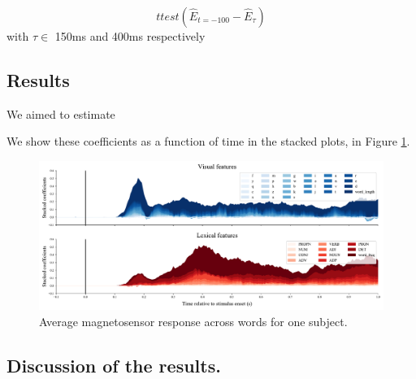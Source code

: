 \begin{equation} ttest(\hat E_{t=-100} - \hat E_{\tau}) \end{equation} with
$\tau \in $ 150ms and 400ms respectively


\subsection{Results}

We aimed to estimate

We show these coefficients as a function of time in the stacked plots, in Figure
\ref{fig:megresult}.

\begin{figure}
  \centering
  \includegraphics[width=\textwidth, trim=0cm 0cm 0cm 0cm, clip=True]{figures/meg_result.pdf}
  \caption{Average magnetosensor response across words for one subject.}
  \label{fig:megresult}
\end{figure}



\subsection{Discussion of the results.}
